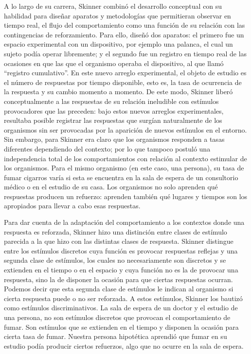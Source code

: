 \documentclass[
  letterpaper,
]{book}
\begin{document}
A lo largo de su carrera, Skinner combinó el desarrollo conceptual con
su habilidad para diseñar aparatos y metodologías que permitieran
observar en tiempo real, el flujo del comportamiento como una función de
su relación con las contingencias de reforzamiento. Para ello, diseñó
dos aparatos: el primero fue un espacio experimental con un dispositivo,
por ejemplo una palanca, el cual un sujeto podía operar libremente; y el
segundo fue un registro en tiempo real de las ocasiones en que las que
el organismo operaba el dispositivo, al que llamó ``registro
cumulativo''. En este nuevo arreglo experimental, el objeto de estudio
es el número de respuestas por tiempo disponible, esto es, la tasa de
ocurrencia de la respuesta y su cambio momento a momento. De este modo,
Skinner liberó conceptualmente a las respuestas de su relación
ineludible con estímulos provocadores que las preceden: bajo estos
nuevos arreglos experimentales, resultaba posible registrar las
respuestas que surgían naturalmente de los organismos sin ser provocadas
por la aparición de nuevos estímulos en el entorno. Sin embargo, para
Skinner era claro que los organismos responden a tasas diferentes
dependiendo del contexto; por lo que tampoco postuló una independencia
total de los comportamientos con relación al contexto estimular de los
organismos. Para el mismo organismo (en este caso, una persona), su tasa
de fumar cigarros varía si esta se encuentra en la sala de espera de un
consultorio médico o en el estudio de su casa. Los organismos no solo
aprenden qué respuestas producen un refuerzo: aprenden también qué
lugares y tiempos son los apropiados para llevar a cabo esas respuestas.

Para dar cuenta de la adaptación del comportamiento a los contextos
donde una respuesta es reforzada, Skinner hizo una distinción entre
clases de estímulo parecida a la que hizo con las distintas clases de
respuesta. Skinner distingue entre los estímulos discretos cuya función
es provocar respuestas reflejas y una segunda clase de estímulos, los
cuales no necesariamente son discretos y se extienden en el tiempo o en
el espacio y cuya función no es la de provocar una respuesta, sino la de
disponer la ocasión para que ciertas respuestas ocurran. Podemos decir
que esta segunda clase de estímulos le indican al organismo si cierta
respuesta puede o no ser reforzada. A estos estímulos, Skinner los
bautizó como estímulos discriminativos. La sala de espera de un doctor y
el estudio de una persona, no son estímulos discretos que provocan el
comportamiento de fumar. Son estímulos que se extienden en el tiempo y
disponen la ocasión para cierta tasa de fumar. Nuestra persona
hipotética aprendió que fumar en su estudio podía producir ciertos
refuerzos, algo que no ocurre en la sala de espera.
\end{document}
